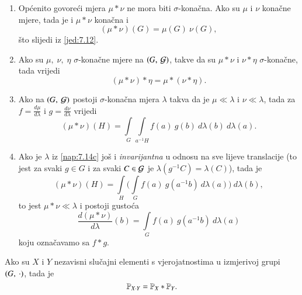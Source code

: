 \begin{nap} \label{nap:7.14}
    \begin{enumerate}[label=(\alph*)]
        \item Op\' cenito govore\' ci mjera $\mu * \nu$ ne mora biti $\sigma$-kona\v cna.
        Ako su $\mu$ i $\nu$ kona\v cne mjere, tada je i $\mu * \nu$ kona\v cna i
        \begin{equation*}
            (\mu * \nu) (G) = \mu (G) \: \nu (G),
        \end{equation*}
        \v sto slijedi iz \eqref{jed:7.12}.
        \item Ako su $\mu, \; \nu, \; \eta$ $\sigma$-kona\v cne mjere na $({G}, \: {\mathcal{G}})$, takve da su $\mu * \nu$ i $\nu * \eta$ $\sigma$-kona\v cne, tada vrijedi
        \begin{equation*}
            (\mu * \nu) * \eta = \mu * (\nu * \eta).
        \end{equation*}
        \item   \label{nap:7.14c}
        Ako na $({G}, \: {\mathcal{G}})$ postoji $\sigma$-kona\v cna mjera $\lambda$ takva da je $\mu \ll \lambda$ i $\nu \ll \lambda$, tada za $f = \frac{d \mu}{d \lambda}$ i $g = \frac{d \nu}{d \lambda}$ vrijedi
        \begin{equation*}
            (\mu * \nu) (H) = \int\limits_G \int\limits_{a^{-1} H} f(a) \: g(b) \: d \lambda (b) \: d \lambda (a).
        \end{equation*}
        \item Ako je $\lambda$ iz \ref{nap:7.14c} jo\v s i \emph{invarijantna} u odnosu na sve lijeve translacije (to jest za svaki $g \in G$ i za svaki $C \in \mathcal{G}$ je $\lambda (g^{-1} C) = \lambda (C)$), tada je
        \begin{equation*}
            (\mu * \nu) (H) = \int\limits_H \Big( \int\limits_G f(a) \: g (a^{-1} b) \: d \lambda (a) \Big) \: d \lambda (b),
        \end{equation*}
        to jest $\mu * \nu \ll \lambda$ i postoji gusto\' ca
        \begin{equation*}
            \frac{d (\mu * \nu)}{d \lambda} (b) = \int\limits_G f(a) \: g (a^{-1} b) \: d \lambda (a)
        \end{equation*}
        koju ozna\v cavamo sa \emph{$f*g$}.
    \end{enumerate}
\end{nap}

\begin{tm}  \label{tm:7.15}
    Ako su $X$ i $Y$ nezavisni slu\v cajni elementi s vjerojatnostima u izmjerivoj grupi $({G}, \: {\cdot})$, tada je
    \begin{equation*}
        \mathbb{P}_{X \cdot Y} = \mathbb{P}_X * \mathbb{P}_Y.
    \end{equation*}
\end{tm}

